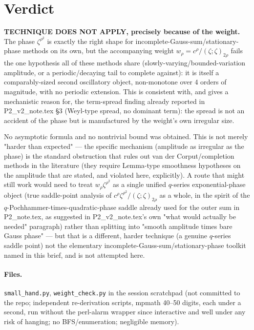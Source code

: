 \documentclass[11pt]{article}
\begin{document}
\section{Verdict}
\textbf{TECHNIQUE DOES NOT APPLY, precisely because of the weight.} The phase $\zeta^{\rho^2}$ is
exactly the right shape for incomplete-Gauss-sum/stationary-phase methods on its own, but the
accompanying weight $w_\rho=c^\rho/(\zeta;\zeta)_{2\rho}$ fails the one hypothesis all of these methods
share (slowly-varying/bounded-variation amplitude, or a periodic/decaying tail to complete against):
it is itself a comparably-sized second oscillatory object, non-monotone over 4 orders of magnitude,
with no periodic extension. This is consistent with, and gives a mechanistic reason for, the
term-spread finding already reported in P2\_v2\_note.tex \S3 (Weyl-type spread, no dominant term): the
spread is not an accident of the phase but is manufactured by the weight's own irregular size.

No asymptotic formula and no nontrivial bound was obtained. This is not merely "harder than expected" —
the specific mechanism (amplitude as irregular as the phase) is the standard obstruction that rules out
van der Corput/completion methods in the literature (they require Lemma-type smoothness hypotheses on
the amplitude that are stated, and violated here, explicitly). A route that might still work would
need to treat $w_\rho\zeta^{\rho^2}$ as a single unified $q$-series exponential-phase object (true
saddle-point analysis of $c^\rho\zeta^{\rho^2}/(\zeta;\zeta)_{2\rho}$ as a whole, in the spirit of the
$q$-Pochhammer-times-quadratic-phase saddle already used for the outer sum in P2\_note.tex, as
suggested in P2\_v2\_note.tex's own "what would actually be needed" paragraph) rather than splitting
into "smooth amplitude times bare Gauss phase" — but that is a different, harder technique (a genuine
$q$-series saddle point) not the elementary incomplete-Gauss-sum/stationary-phase toolkit named in this
brief, and is not attempted here.

\paragraph{Files.} \texttt{small\_hand.py}, \texttt{weight\_check.py} in the session scratchpad
(not committed to the repo; independent re-derivation scripts, mpmath 40--50 digits, each under a
second, run without the perl-alarm wrapper since interactive and well under any risk of hanging;
no BFS/enumeration; negligible memory).
\end{document}

